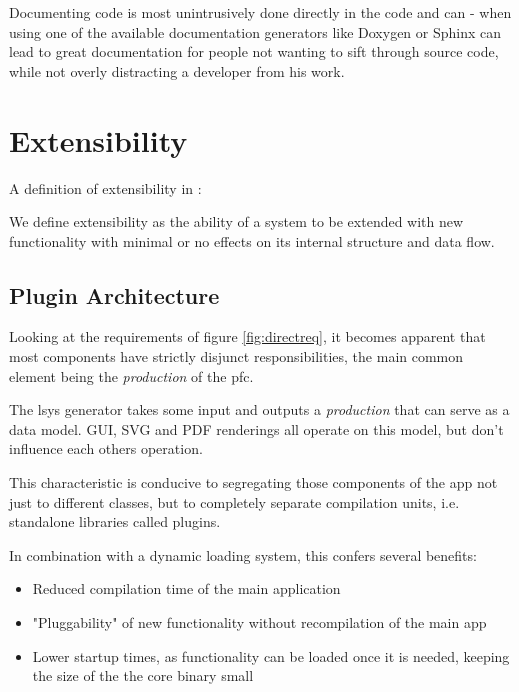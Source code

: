 Documenting code is most unintrusively done directly in the code and can - when using one of the available documentation generators like Doxygen or Sphinx can lead to great documentation for people not wanting to sift through source code, while not overly distracting a developer from his work.

\section{Extensibility}

A definition of extensibility in \citet[p.3]{Johansson}:
\begin{definition}[Extensibility]
We define extensibility as the ability of a system to be extended with new functionality with minimal or no effects on its internal structure and data flow.
\end{definition}

\subsection{Plugin Architecture}\label{sec:resplug}
Looking at the requirements of figure \ref{fig:directreq}, it becomes apparent that most components have strictly disjunct responsibilities, the main common element being the \textit{production} of the \gls{pfc}.

The \gls{lsys} generator takes some input and outputs a \textit{production} that can serve as a data model. GUI, SVG and PDF renderings all operate on this model, but don't influence each others operation.

This characteristic is conducive to segregating those components of the app not just to different classes, but to completely separate compilation units, i.e. standalone libraries called plugins.

In combination with a dynamic loading system, this confers several benefits:

\begin{itemize}
	\item  Reduced compilation time of the main application
	\item  "Pluggability" of new functionality without recompilation of the main app
	\item  Lower startup times, as functionality can be loaded once it is needed, keeping the size of the the core binary small
\end{itemize}

